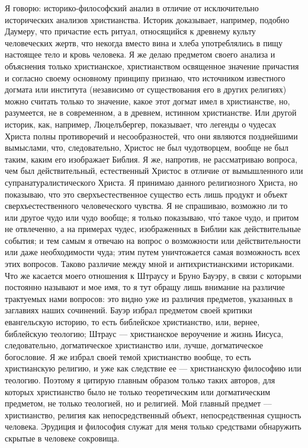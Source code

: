 \documentclass[12pt,oneside]{book}
\begin{document}
Я говорю: историко-философский анализ в отличие от исключительно исторических анализов христианства. Историк доказывает, например, подобно Даумеру, что причастие есть ритуал, относящийся к древнему культу человеческих жертв, что некогда вместо вина и хлеба употреблялись в пищу настоящее тело и кровь человека. Я же делаю предметом своего анализа и объяснения только христианское, христианством освященное значение причастия и согласно своему основному принципу признаю, что источником известного догмата или института (независимо от существования его в других религиях) можно считать только то значение, какое этот догмат имел в христианстве, но, разумеется, не в современном, а в древнем, истинном христианстве. Или другой историк, как, например, Люцелъбергер, показывает, что легенды о чудесах Христа полны противоречий и несообразностей, что они являются позднейшими вымыслами, что, следовательно, Христос не был чудотворцем, вообще не был таким, каким его изображает Библия. Я же, напротив, не рассматриваю вопроса, чем был действительный, естественный Христос в отличие от вымышленного или супранатуралистического Христа. Я принимаю данного религиозного Христа, но показываю, что это сверхъестественное существо есть лишь продукт и объект сверхъестественного человеческого чувства. Я не спрашиваю, возможно ли то или другое чудо или чудо вообще; я только показываю, чт\'{о} такое чудо, и притом не отвлеченно, а на примерах чудес, изображенных в Библии как действительные события; и тем самым я отвечаю на вопрос о возможности или действительности или даже необходимости чуда; этим путем уничтожается самая возможность всех этих вопросов. Таково различие между мной и антихристианскими историками. Что же касается моего отношения к Штраусу и Бруно Бауэру, в связи с которыми постоянно называют и мое имя, то я тут обращу лишь внимание на различие трактуемых нами вопросов: это видно уже из различия предметов, указанных в заглавиях наших сочинений. Бауэр избрал предметом своей критики евангельскую историю, то есть библейское христианство, или, вернее, библейскую теологию; Штраус --- христианское вероучение и жизнь Иисуса, следовательно, догматическое христианство или, лучше, догматическое богословие. Я же избрал своей темой христианство вообще, то есть христианскую религию, и уже как следствие ее --- христианскую философию или теологию. Поэтому я цитирую главным образом только таких авторов, для которых христианство было не только теоретическим или догматическим предметом, не только теологией, но и религией. Мой главный предмет --– христианство, религия как непосредственный объект, непосредственная сущность человека. Эрудиция и философия служат для меня только средствами обнаружить скрытые в человеке сокровища.
\end{document}
